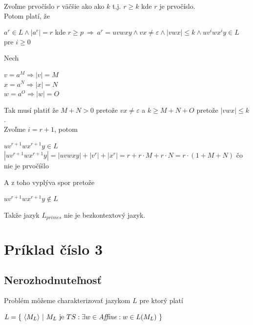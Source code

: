 \documentclass[11pt,a4paper]{article}
\begin{document}
Zvoľme prvočíslo $r$ väčšie ako ako $k$ t.j. $r \geq k$ kde $r$ je prvočíslo.\\

Potom platí, že

\begin{center}
$a^{r} \in L \wedge |a^{r}| = r$ kde $r \geq p \ \Longrightarrow \ a^{r} = uvwxy \wedge vx \neq \varepsilon \wedge |vwx| \leq k \wedge uv^{i}wx^{i}y \in L$ pre $i \geq 0$\\
\end{center}

Nech
\begin{center}
$v = a^{M} \Rightarrow |v| = M$\\
$x = a^{N} \Rightarrow |x| = N$\\
$w = a^{O} \Rightarrow |w| = O$\\
\end{center}

Tak musí platiť že $M+N > 0$ pretože $vx \neq \varepsilon$ a $k \geq M+N+O$ pretože $|vwx| \leq k$.\\

Zvoľme $i=r+1$, potom

\begin{center}
$uv^{r+1}wx^{r+1}y \in L$\\[0.5em]
$|uv^{r+1}wx^{r+1}y| = |uvwxy| + |v^{r}| + |x^{r}| = r + r \cdot M + r \cdot N = r \cdot (1+M+N)$ čo nie je prvočíšlo\\
\end{center}

A z toho vyplýva spor pretože

\begin{center}
$uv^{r+1}wx^{r+1}y \notin L$
\end{center}

Takže jazyk $L_{primes}$ nie je bezkontextový jazyk.

\newpage
\section{Príklad číslo 3} %

\subsection{Nerozhodnuteľnosť}

Problém môžeme charakterizovať jazykom $L$ pre ktorý platí

\begin{center}
    $L = \{ \ \langle M_{L} \rangle \ | \ M_{L} \text{ je } TS: \exists w \in \text{\textit{Affine}}: w \in L(M_{L}) \ \}$
\end{center}
\end{document}
